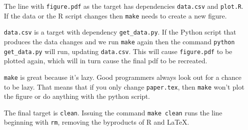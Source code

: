 \documentclass[12pt]{article}
\begin{document}
The line with {\tt figure.pdf} as the target has dependencies {\tt data.csv} and {\tt plot.R}. If the data or the R script changes then {\tt make} needs to create a new figure.

{\tt data.csv} is a target with dependency {\tt get\_data.py}. If the Python script that produces the data changes and we run {\tt make} again then the command {\tt python get\_data.py} will run, updating {\tt data.csv}. This will cause {\tt figure.pdf} to be plotted again, which will in turn cause the final pdf to be recreated.

{\tt make} is great because it's lazy. Good programmers always look out for a chance to be lazy. That means that if you only change {\tt paper.tex}, then {\tt make} won't plot the figure or do anything with the python script.

The final target is {\tt clean}. Issuing the command {\tt make clean} runs the line beginning with {\tt rm}, removing the byproducts of R and \LaTeX.
\end{document}

